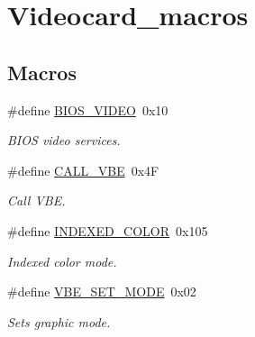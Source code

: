\hypertarget{group__videocard__macros}{}\section{Videocard\+\_\+macros}
\label{group__videocard__macros}
\subsection*{Macros}
\begin{DoxyCompactItemize}
\item 
\mbox{\label{group__videocard__macros_gac28d52edfa71400c06a4ed014eed978d}} 
\#define \hyperlink{group__videocard__macros_gac28d52edfa71400c06a4ed014eed978d}{B\+I\+O\+S\+\_\+\+V\+I\+D\+EO}~0x10
\begin{DoxyCompactList}\small\item\em B\+I\+OS video services. \end{DoxyCompactList}\item 
\mbox{\label{group__videocard__macros_ga581dbb505412e843d246d64c17e33c29}} 
\#define \hyperlink{group__videocard__macros_ga581dbb505412e843d246d64c17e33c29}{C\+A\+L\+L\+\_\+\+V\+BE}~0x4F
\begin{DoxyCompactList}\small\item\em Call V\+BE. \end{DoxyCompactList}\item 
\mbox{\label{group__videocard__macros_ga8cc35ceb6edb14480e5afceb3ce2ee8b}} 
\#define \hyperlink{group__videocard__macros_ga8cc35ceb6edb14480e5afceb3ce2ee8b}{I\+N\+D\+E\+X\+E\+D\+\_\+\+C\+O\+L\+OR}~0x105
\begin{DoxyCompactList}\small\item\em Indexed color mode. \end{DoxyCompactList}\item 
\mbox{\label{group__videocard__macros_ga02477c4996ff058aee590b54f2146eb5}} 
\#define \hyperlink{group__videocard__macros_ga02477c4996ff058aee590b54f2146eb5}{V\+B\+E\+\_\+\+S\+E\+T\+\_\+\+M\+O\+DE}~0x02
\begin{DoxyCompactList}\small\item\em Sets graphic mode. \end{DoxyCompactList}\item 

\end{DoxyCompactItemize}
